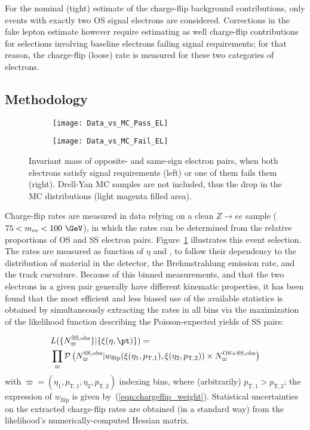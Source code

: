 For the nominal (tight) estimate of the charge-flip background contributions, only events with exactly two OS signal electrons are considered. 
Corrections in the fake lepton estimate however require estimating as well charge-flip contributions for selections involving 
baseline electrons failing signal requirements; 
for that reason, the charge-flip (loose) rate is measured for these two categories of electrons. 

\subsection*{Methodology}
\label{subsec:chargeflip_method}

\begin{figure}[t!]
\centering
\begin{subfigure}[b]{0.45\textwidth}
	\texttt{[image: Data\_vs\_MC\_Pass\_EL]}
\end{subfigure}
\begin{subfigure}[b]{0.45\textwidth}
	\texttt{[image: Data\_vs\_MC\_Fail\_EL]}
\end{subfigure}
\caption{Invariant mass of opposite- and same-sign electron pairs, 
when both electrons satisfy signal requirements (left) or one of them fails them (right). Drell-Yan MC samples are not included, thus the drop in the MC distributions (light magenta filled area).}
\label{fig:chargeflip_mee}
\end{figure}

Charge-flip rates are measured in data relying on a clean $Z\to ee$ sample ($75<m_{ee}<100~\GeV$), 
in which the rates can be determined from the relative proportions of OS and SS electron pairs. 
Figure~\ref{fig:chargeflip_mee} illustrates this event selection. 
The rates are measured as function of $\eta$ and \pt, to follow their dependency to the distribution of material in the detector, 
the Brehmstrahlung emission rate, and the track curvature. 
Because of this binned measurements, and that the two electrons in a given pair generally have different kinematic properties, 
it has been found that the most efficient and less biased use of the available statistics 
is obtained by simultaneously extracting the rates in all bins via the maximization of the likelihood function describing the 
Poisson-expected yields of SS pairs: 

\begin{equation}
\begin{aligned}
{} & L(\{N^\text{SS,obs}_\varpi\}|\{\xi(\eta,\pt)\}) 
= \\
& \prod_{\varpi} \mathcal P\left(N^\text{SS,obs}_\varpi|w_\text{flip}(\xi(\eta_1,p_{\mathrm{T},1}),\xi(\eta_2,p_{\mathrm{T},2}))\times N^\text{OS+SS,obs}_\varpi\right)
\label{eqn:chargeflip_likelihood}
\end{aligned}
\end{equation}
with $\varpi=(\eta_1,p_{\mathrm{T},1},\eta_2,p_{\mathrm{T},2})$ indexing bins, where (arbitrarily) $p_{\mathrm{T},1}>p_{\mathrm{T},2}$; 
the expression of $w_\text{flip}$ is given by~(\ref{eqn:chargeflip_weight}). 
Statistical uncertainties on the extracted charge-flip rates are obtained (in a standard way) from the likelihood's numerically-computed Hessian matrix. 

